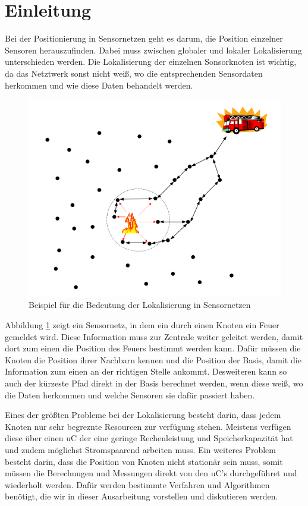 \section{Einleitung}

Bei der Positionierung in Sensornetzen geht es darum, die Position
einzelner Sensoren herauszufinden. Dabei muss zwischen globaler und
lokaler Lokalisierung unterschieden werden. Die Lokalisierung der
einzelnen Sonsorknoten ist wichtig, da das Netztwerk sonst nicht weiß,
wo die entsprechenden Sensordaten herkommen und wie diese Daten
behandelt werden.

\begin{figure}[h!]
  \centering
  \includegraphics[scale=0.6]{img/lokalisierung_1}

  \caption{Beispiel für die Bedeutung der Lokalisierung in
    Sensornetzen}
  \label{fig:local}
\end{figure}

Abbildung \ref{fig:local} zeigt ein Sensornetz, in dem ein durch einen
Knoten ein Feuer gemeldet wird. Diese Information muss zur Zentrale
weiter geleitet werden, damit dort zum einen die Position des Feuers
bestimmt werden kann. Dafür müssen die Knoten die Position ihrer
Nachbarn kennen und die Position der Basis, damit die Information zum
einen an der richtigen Stelle ankommt. Desweiteren kann so auch der
kürzeste Pfad direkt in der Basis berechnet werden, wenn diese weiß,
wo die Daten herkommen und welche Sensoren sie dafür passiert haben.
\cite{gholami2011} 

Eines der größten Probleme bei der Lokalisierung besteht darin, dass
jedem Knoten nur sehr begreznte Resourcen zur verfügung stehen.
Meistens verfügen diese über einen \ac{uC} der eine geringe
Rechenleistung und Speicherkapazität hat und zudem möglichst
Stromspaarend arbeiten muss. \cite{timmermann} Ein weiteres Problem
besteht darin, dass die Position von Knoten nicht stationär sein muss,
somit müssen die Berechnugen und Messungen direkt von den \ac{uC}'s
durchgeführet und wiederholt werden. \cite{roehrig2009}  Dafür werden
bestimmte Verfahren und Algorithmen benötigt, die wir in dieser
Ausarbeitung vorstellen und diskutieren werden.